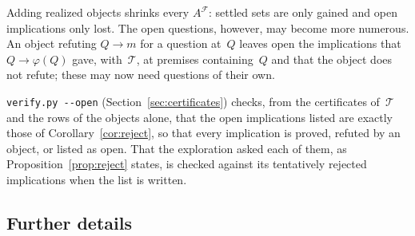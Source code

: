 \documentclass[11pt,a4paper]{article}
\theoremstyle{definition}
\theoremstyle{remark}
\newcommand{\code}[1]{\texttt{#1}}
\begin{document}
Adding realized objects shrinks every $A^{\mathcal{F}}$: settled sets are only gained and open implications only lost. The open questions, however, may become more numerous. An object refuting $Q \to m$ for a question at~$Q$ leaves open the implications that $Q \to \varphi(Q)$ gave, with~$\mathcal{T}$, at premises containing~$Q$ and that the object does not refute; these may now need questions of their own.

\code{verify.py -{}-open} (Section~\ref{sec:certificates}) checks, from the certificates of~$\mathcal{T}$ and the rows of the objects alone, that the open implications listed are exactly those of Corollary~\ref{cor:reject}, so that every implication is proved, refuted by an object, or listed as open. That the exploration asked each of them, as Proposition~\ref{prop:reject} states, is checked against its tentatively rejected implications when the list is written.

\subsection{Further details}\label{sec:details}
\end{document}

